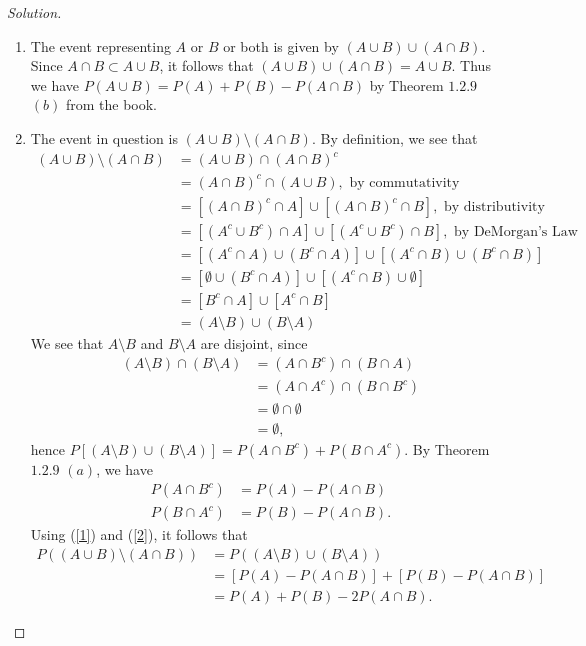 \documentclass[12pt]{article}
\theoremstyle{definition}
\theoremstyle{plain}
\newenvironment{solution}
  {\begin{proof}[Solution]}
  {\end{proof}}
\begin{document}
\begin{enumerate}
\begin{solution}
\begin{enumerate}
	\item The event representing $ A $ or $ B $ or both is given by $ (A \cup B) \cup (A \cap B) $.
		Since $ A \cap B \subset A \cup B $, it follows that $ (A \cup B) \cup (A \cap B) =  A \cup B$. Thus we have $ P(A \cup B) = P(A) + P(B) - P(A \cap B) $ by Theorem $ 1.2.9 $ $ (b) $ from the book.
		
	\item The event in question is $ (A \cup B) \setminus (A \cap B) $. By definition, we see that 
		\begin{align*}
			(A \cup B) \setminus (A \cap B) &= (A \cup B) \cap (A \cap B)^c\\
			&= (A \cap B)^c \cap (A \cup B), \text{ by commutativity}\\
			&= [ (A \cap B)^c \cap A] \cup [ (A \cap B)^c \cap B], \text{ by distributivity}\\
			&= [ (A^c \cup B^c) \cap A ] \cup [ (A^c \cup B^c) \cap B ], \text{ by DeMorgan's Law}\\
			&= [ (A^c \cap A) \cup (B^c \cap A) ] \cup [ (A^c \cap B) \cup (B^c \cap B) ] \\
			&= [ \emptyset \cup (B^c \cap A) ] \cup [ (A^c \cap B) \cup \emptyset ]\\
			&= [ B^c \cap A ] \cup [ A^c \cap B ]\\
			&= (A \setminus B) \cup (B \setminus A)
		\end{align*}
		We see that $ A \setminus B $ and $ B \setminus A $ are disjoint, since 
		\begin{align*}	
			(A \setminus B) \cap (B \setminus A) &= (A \cap B^c) \cap (B \cap A)\\
			&= (A \cap A^c) \cap (B \cap B^c)\\
			&= \emptyset \cap \emptyset\\
			&= \emptyset,
		\end{align*}
		hence $ P[ (A \setminus B) \cup (B \setminus A)] = P(A \cap B^c) + P(B \cap A^c) $. By Theorem $ 1.2.9 $ $(a)$, we have
		\begin{align}
			\label{1} P(A \cap B^c) &= P(A) - P(A \cap B)\\
			\label{2} P(B \cap A^c) &= P(B) - P(A \cap B).
		\end{align}
		Using (\ref{1}) and (\ref{2}), it follows that
		\begin{align*}
			P((A \cup B) \setminus (A \cap B)) &= P((A \setminus B) \cup (B \setminus A))\\
			&= [ P(A) - P(A \cap B) ] + [ P(B) - P(A \cap B)]\\
			&= P(A) + P(B) - 2 P(A \cap B).
		\end{align*}
		

\end{enumerate}
\end{solution}
\end{enumerate}
\end{document}
